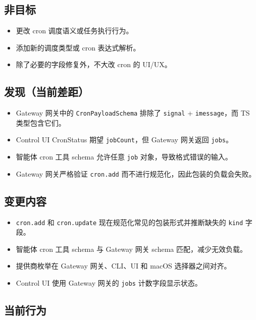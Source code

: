 \subsection{非目标}


\begin{itemize}
  \item 更改 cron 调度语义或任务执行行为。
  \item 添加新的调度类型或 cron 表达式解析。
  \item 除了必要的字段修复外，不大改 cron 的 UI/UX。
\end{itemize}


\subsection{发现（当前差距）}


\begin{itemize}
  \item Gateway 网关中的 \texttt{CronPayloadSchema} 排除了 \texttt{signal} + \texttt{imessage}，而 TS 类型包含它们。
  \item Control UI CronStatus 期望 \texttt{jobCount}，但 Gateway 网关返回 \texttt{jobs}。
  \item 智能体 cron 工具 schema 允许任意 \texttt{job} 对象，导致格式错误的输入。
  \item Gateway 网关严格验证 \texttt{cron.add} 而不进行规范化，因此包装的负载会失败。
\end{itemize}


\subsection{变更内容}


\begin{itemize}
  \item \texttt{cron.add} 和 \texttt{cron.update} 现在规范化常见的包装形式并推断缺失的 \texttt{kind} 字段。
  \item 智能体 cron 工具 schema 与 Gateway 网关 schema 匹配，减少无效负载。
  \item 提供商枚举在 Gateway 网关、CLI、UI 和 macOS 选择器之间对齐。
  \item Control UI 使用 Gateway 网关的 \texttt{jobs} 计数字段显示状态。
\end{itemize}


\subsection{当前行为}


